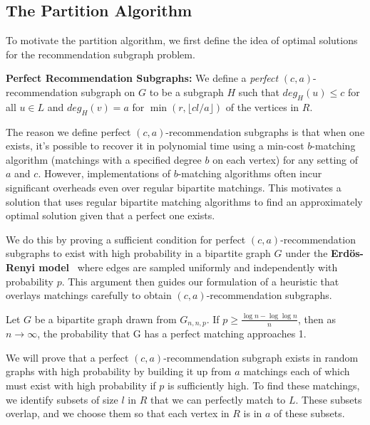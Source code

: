 \subsection{The Partition Algorithm}
To motivate the partition algorithm, we first define the idea of optimal solutions for the recommendation subgraph problem.
\vs

{\bf Perfect Recommendation Subgraphs:} We define a \emph{perfect} $(c,a)$-recommendation subgraph on $G$ to be a subgraph $H$ such that
$deg_H(u)\leq c$ for all $u\in L$ and $deg_H(v)=a$ for
$\min(r,\lfloor cl/a \rfloor)$ of the vertices in $R$.
\vs

The reason we define perfect $(c,a)$-recommendation subgraphs is that when one
exists, it's possible to recover it in polynomial time using a min-cost
$b$-matching algorithm (matchings with a specified degree $b$ on each vertex)
for any setting of $a$ and $c$. However, implementations of $b$-matching
algorithms often incur significant overheads even over regular bipartite matchings.
This motivates a solution that uses regular bipartite matching algorithms to find
an approximately optimal solution given that a perfect one exists. \vs

We do this by proving a sufficient condition for perfect $(c,a)$-recommendation
subgraphs to exist with high probability in a bipartite graph $G$ under the
{\bf Erd\"os-Renyi model}~\cite{ErdosRenyi59} where edges are sampled uniformly and
independently with probability $p$. This argument then guides our formulation of
a heuristic that overlays matchings carefully to obtain $(c,a)$-recommendation
subgraphs. \vs

\begin{thm}\cite{Janson2011}
\label{random_matching_threshold}
Let $G$ be a bipartite graph drawn from $G_{n, n, p}$. If $p \geq \frac{\log n -
\log\log n}{n}$, then as $n\to\infty$,  the probability that G has a perfect
    matching approaches 1.
\end{thm}

We will prove that a perfect $(c,a)$-recommendation subgraph exists in
random graphs with high probability by building it up from $a$
matchings each of which must exist with high probability if $p$ is
sufficiently high. To find these matchings, we identify subsets of size
$l$ in $R$ that we can perfectly match to $L$. These subsets overlap,
and we choose them so that each vertex in $R$ is in $a$ of these subsets. 

